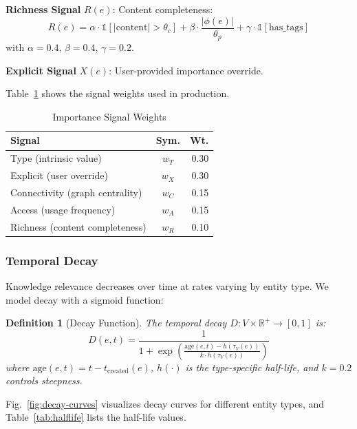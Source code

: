 \documentclass[10pt,journal,compsoc]{IEEEtran}
\newtheorem{definition}{Definition}
\begin{document}
\textbf{Richness Signal} $R(e)$: Content completeness:
\begin{equation}
R(e) = \alpha \cdot \mathbb{1}[|\text{content}| > \theta_c] + \beta \cdot \frac{|\phi(e)|}{\theta_p} + \gamma \cdot \mathbb{1}[\text{has\_tags}]
\end{equation}
with $\alpha = 0.4$, $\beta = 0.4$, $\gamma = 0.2$.

\textbf{Explicit Signal} $X(e)$: User-provided importance override.

Table~\ref{tab:weights} shows the signal weights used in production.

\begin{table}[t]
\caption{Importance Signal Weights}
\label{tab:weights}
\centering
\small
\renewcommand{\arraystretch}{1.3}
\begin{tabular}{@{}p{} c r@{}}
\toprule
\textbf{Signal} & \textbf{Sym.} & \textbf{Wt.} \\
\midrule
Type (intrinsic value) & $w_T$ & 0.30 \\
Explicit (user override) & $w_X$ & 0.30 \\
Connectivity (graph centrality) & $w_C$ & 0.15 \\
Access (usage frequency) & $w_A$ & 0.15 \\
Richness (content completeness) & $w_R$ & 0.10 \\
\bottomrule
\end{tabular}
\end{table}

\subsubsection{Temporal Decay}

Knowledge relevance decreases over time at rates varying by entity type. We model decay with a sigmoid function:

\begin{definition}[Decay Function]
The temporal decay $D: V \times \mathbb{R}^+ \to [0,1]$ is:
\begin{equation}
D(e, t) = \frac{1}{1 + \exp\left(\frac{\text{age}(e, t) - h(\tau_V(e))}{k \cdot h(\tau_V(e))}\right)}
\end{equation}
where $\text{age}(e,t) = t - t_{\text{created}}(e)$, $h(\cdot)$ is the type-specific half-life, and $k = 0.2$ controls steepness.
\end{definition}

Fig.~\ref{fig:decay-curves} visualizes decay curves for different entity types, and Table~\ref{tab:halflife} lists the half-life values.
\end{document}
